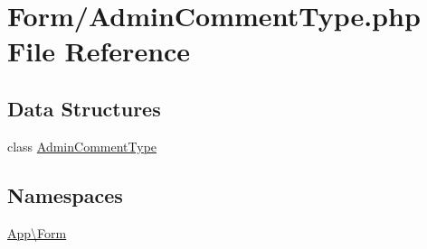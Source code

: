 \hypertarget{_admin_comment_type_8php}{}\section{Form/\+Admin\+Comment\+Type.php File Reference}
\label{_admin_comment_type_8php}
\subsection*{Data Structures}
\begin{DoxyCompactItemize}
\item 
class \mbox{\hyperlink{class_app_1_1_form_1_1_admin_comment_type}{Admin\+Comment\+Type}}
\end{DoxyCompactItemize}
\subsection*{Namespaces}
\begin{DoxyCompactItemize}
\item 
 \mbox{\hyperlink{namespace_app_1_1_form}{App\textbackslash{}\+Form}}
\end{DoxyCompactItemize}
